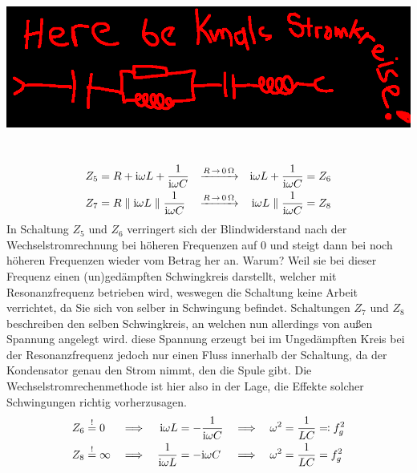 \begin{center}\includegraphics[width=.6\textwidth]{placeholder.png}\end{center}~\\
%
%
\begin{align*}
    \qquad&&Z_5 &= R + \mathrm{i} \omega L + \frac{1}{\mathrm{i} \omega C} & \xrightarrow{R \,\rightarrow \,\SI{0}{\ohm}} && \mathrm{i} \omega L + \frac{1}{\mathrm{i} \omega C} &= Z_6 
    &&\qquad\\
    \qquad&&Z_7 &= R \parallel \mathrm{i} \omega L \parallel \frac{1}{\mathrm{i} \omega C} & \xrightarrow{R \,\rightarrow \,\SI{0}{\ohm}} && \mathrm{i} \omega L \parallel \frac{1}{\mathrm{i} \omega C} &= Z_8 &&\qquad\\
\end{align*}
In Schaltung $Z_5$ und $Z_6$ verringert sich der Blindwiderstand nach der Wechselstromrechnung bei höheren Frequenzen auf 0 und steigt dann bei noch höheren Frequenzen wieder vom Betrag her an.
Warum? Weil sie bei dieser Frequenz einen (un)gedämpften Schwingkreis darstellt, welcher mit Resonanzfrequenz betrieben wird, weswegen die Schaltung keine Arbeit verrichtet, da Sie sich von selber in Schwingung befindet.
Schaltungen $Z_7$ und $Z_8$ beschreiben den selben Schwingkreis, an welchen nun allerdings von außen 
Spannung angelegt wird. diese Spannung erzeugt bei im Ungedämpften Kreis bei der Resonanzfrequenz jedoch nur einen Fluss innerhalb der Schaltung, da der Kondensator genau den Strom nimmt, den die Spule gibt.
Die Wechselstromrechenmethode ist hier also in der Lage, die Effekte solcher Schwingungen richtig vorherzusagen.
\begin{align*}
    Z_6 &\stackrel{!}{=} 0 &\implies&& \mathrm{i} \omega L &= -\frac{1}{\mathrm{i} \omega C} &\implies&& \omega^2 &= \frac{1}{LC} \eqqcolon f_{g}^2\\
    Z_8 &\stackrel{!}{=} \infty &\implies&& \frac{1}{\mathrm{i} \omega L} &= -\mathrm{i} \omega C &\implies&& \omega^2 &= \frac{1}{LC} = f_{g}^2\\
\end{align*}

